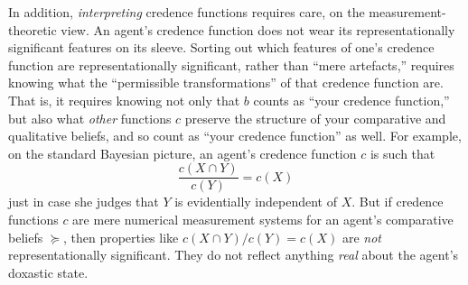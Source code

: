 In addition, \textit{interpreting} credence functions requires care, on the measurement-theoretic view. An agent's credence function does not wear its representationally significant features on its sleeve. Sorting out which features of one's credence function are representationally significant, rather than ``mere artefacts,'' requires knowing what the ``permissible transformations'' of that credence function are. That is, it requires knowing not only that $b$ counts as ``your credence function,'' but also what \textit{other} functions $c$ preserve the structure of your comparative and qualitative beliefs, and so count as ``your credence function'' as well. For example, on the standard Bayesian picture, an agent's credence function $c$ is such that
\[
\frac{c(X\cap Y)}{c(Y)} = c(X)
\]
just in case she judges that $Y$ is evidentially independent of $X$. But if credence functions $c$ are mere numerical measurement systems for an agent's comparative beliefs $\succeq$, then properties like $c(X\cap Y)/c(Y)=c(X)$ are \textit{not} representationally significant. They do not reflect anything \textit{real} about the agent's doxastic state.

